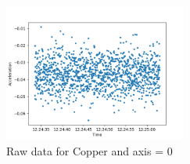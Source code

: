 \begin{figure}[h!]
    \centering
    \includegraphics[width=60mm]{Python/Lab6/Plots/rawdataCUa0.png}
    \caption{Raw data for Copper and axis = 0} 
    \label{fig:rawdata}
\end{figure}